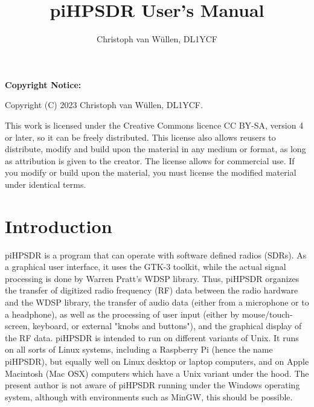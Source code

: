 \documentclass[12pt]{book}
\begin{document}
\frontmatter
\title{
piHPSDR User's Manual
}
\author{
Christoph van W\"ullen, DL1YCF
}
%
\maketitle
\textbf{Copyright Notice:}

Copyright (C) 2023 Christoph van W\"ullen, DL1YCF.

This work is licensed under
the Creative Commons licence CC BY-SA, version 4 or later, so it can be freely distributed.
 This license also allows reusers to distribute, modify and build upon the material in any medium or format,
as long as attribution is given to the creator. The license allows for commercial use.
If you modify or build upon the material, you must license the modified material under identical terms.



\tableofcontents
\mainmatter
\chapter{Introduction}
piHPSDR is a program that can operate with software defined radios (SDRs). As a graphical user interface,
it uses the GTK-3 toolkit, while the actual signal processing is done by Warren Pratt's WDSP library. Thus,
piHPSDR organizes the transfer of digitized radio frequency (RF) data between the radio hardware and the WDSP library, the
transfer of audio data (either from a microphone or to a headphone), as well as the processing of user
input (either by mouse/touch-screen, keyboard, or external "knobs and buttons"),
 and the graphical display of the RF data. piHPSDR is intended
to run on different variants of Unix. It runs on all sorts of Linux systems, including a Raspberry Pi (hence
the name piHPSDR), but equally well on Linux desktop or laptop computers, and on Apple Macintosh (Mac OSX)
computers which have a Unix variant under the hood. The present author is not aware of piHPSDR running
under the Windows operating system, although with environments such as MinGW, this should be possible.
\end{document}
